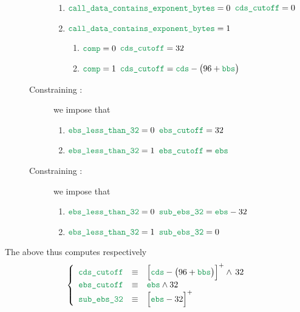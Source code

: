 \begin{description}
\begin{description}
				\begin{enumerate}
					\item \If $\locCallDataContainsExponentBytes = 0$ \Then $\locCdsCutoff = 0$
					\item \If $\locCallDataContainsExponentBytes = 1$ \Then
						\begin{enumerate}
							\item \If $\locCmp = 0$ \Then $\locCdsCutoff = 32$
							\item \If $\locCmp = 1$ \Then $\locCdsCutoff = \locCds - \big( 96 + \locBbs \big)$
						\end{enumerate}
				\end{enumerate}
			\item[Constraining \locEbsCutoff       {}:] we impose that
				\begin{enumerate}
					\item \If $\locEbsLtThirtyTwo = 0$ \Then $\locEbsCutoff = 32$ 
					\item \If $\locEbsLtThirtyTwo = 1$ \Then $\locEbsCutoff = \locEbs$ 
				\end{enumerate}
			\item[Constraining \locEbsSubThirtyTwo {}:] we impose that
				\begin{enumerate}
					\item \If $\locEbsLtThirtyTwo = 0$ \Then $\locEbsSubThirtyTwo = \locEbs - 32$ 
					\item \If $\locEbsLtThirtyTwo = 1$ \Then $\locEbsSubThirtyTwo = 0$ 
				\end{enumerate}
		\end{description}
\end{description}
\saNote{} The above thus computes respectively
\[
	\left\{ \begin{array}{lcl}
		\locCdsCutoff           & \equiv & \Big[ \locCds - \big( 96 + \locBbs \big) \Big] ^ + \wedge \, 32 \\
		\locEbsCutoff           & \equiv & \locEbs \wedge 32                                               \\
		\locEbsSubThirtyTwo     & \equiv & \Big[ \locEbs - 32 \Big] ^ +                                    \\
	\end{array} \right.
\]
